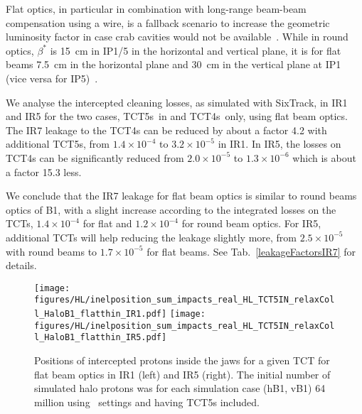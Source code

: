 Flat optics, in particular in combination with long-range beam-beam compensation using a wire, is a fallback scenario to increase the geometric luminosity factor in case crab cavities would not be available~\cite{flatRef}. While in round optics, $\beta^*$ is 15~cm in IP1/5 in the horizontal and vertical plane, it is for flat beams 7.5~cm in the horizontal plane and 30~cm in the vertical plane at IP1 (vice versa for IP5)~\cite{opticsWebRef}. 

We analyse the intercepted cleaning losses, as simulated with SixTrack, in IR1 and IR5 for the two cases, TCT5s~in and TCT4s~only, using flat beam optics. The IR7 leakage to the TCT4s can be reduced by about a factor 4.2 with additional TCT5s, from $1.4 \times 10^{-4}$ to $3.2 \times 10^{-5}$ in IR1. In IR5, the losses on TCT4s can be significantly reduced from $2.0 \times 10^{-5}$ to $1.3 \times 10^{-6}$ which is about a factor 15.3 less. 

We conclude that the IR7 leakage for flat beam optics is similar to round beams optics of B1, with a slight increase according to the integrated losses on the TCTs, $1.4 \times 10^{-4}$ for flat and $1.2 \times 10^{-4}$ for round beam optics. For IR5, additional TCTs will help reducing the leakage slightly more, from $2.5 \times 10^{-5}$ with round beams to $1.7 \times 10^{-5}$ for flat beams. See Tab.~\ref{leakageFactorsIR7} for details.


\begin{figure}%
\begin{center}
  \texttt{[image: figures/HL/inelposition\_sum\_impacts\_real\_HL\_TCT5IN\_relaxColl\_HaloB1\_flatthin\_IR1.pdf]}
  \texttt{[image: figures/HL/inelposition\_sum\_impacts\_real\_HL\_TCT5IN\_relaxColl\_HaloB1\_flatthin\_IR5.pdf]}
\end{center}
 \caption{Positions of intercepted protons inside the jaws for a given TCT for flat beam optics in IR1 (left) and IR5 (right). The initial number of simulated halo protons was for each simulation case (hB1, vB1) 64 million using \twosigmaret~settings and having TCT5s included.
   \label{fig:inelflat}}
\end{figure}

